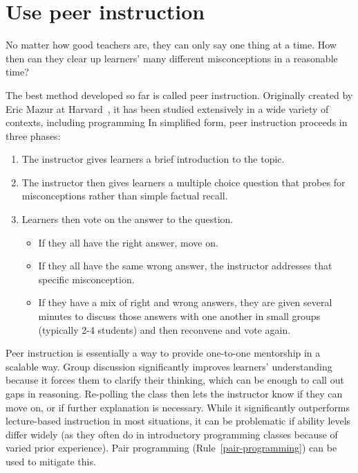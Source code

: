 \documentclass{article}
\begin{document}
\section{Use peer instruction}\label{peer-instruction}

No matter how good teachers are,
they can only say one thing at a time.
How then can they clear up learners' many different misconceptions
in a reasonable time?

The best method developed so far is called peer instruction.
Originally created by Eric Mazur at Harvard~\citep{mazur-peer-instruction},
it has been studied extensively in a wide variety of contexts,
including programming \cite{porter,cutts}
In simplified form,
peer instruction proceeds in three phases:

\begin{enumerate}

\item The instructor gives learners a brief introduction to the topic.

\item The instructor then gives learners a multiple choice question
   that probes for misconceptions rather than simple factual recall.

\item Learners then vote on the answer to the question.

  \begin{itemize}
  \item If they all have the right answer, move on.
  \item If they all have the same wrong answer,
    the instructor addresses that specific misconception.
  \item If they have a mix of right and wrong answers,
    they are given several minutes to discuss those answers with one another
    in small groups (typically 2-4 students)
    and then reconvene and vote again.
  \end{itemize}

\end{enumerate}

Peer instruction is essentially
a way to provide one-to-one mentorship in a scalable way.
Group discussion significantly improves learners' understanding
because it forces them to clarify their thinking,
which can be enough to call out gaps in reasoning.
Re-polling the class then lets the instructor know if they can move on,
or if further explanation is necessary.
While it significantly outperforms lecture-based instruction in most situations,
it can be problematic if ability levels differ widely
(as they often do in introductory programming classes
because of varied prior experience).
Pair programming (Rule~\ref{pair-programming}) can be used to mitigate this.
\end{document}
